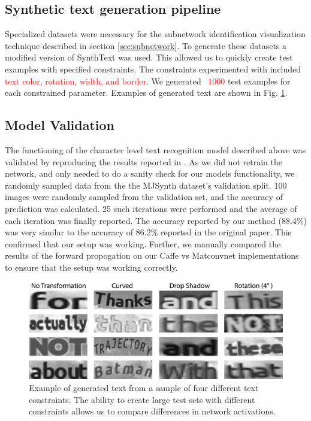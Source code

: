 \documentclass[10pt,twocolumn,letterpaper]{article}
\begin{document}
\subsection{Synthetic text generation pipeline} \label{sec:synthtext}
Specialized datasets were necessary for the subnetwork identification visualization technique described in section \ref{sec:subnetwork}.
To generate these datasets a modified version of SynthText \cite{Gupta16} was used. This allowed us to quickly create test examples with specified constraints. The constraints experimented with included \textcolor{red}{text color, rotation, width, and border}. We generated \textcolor{red}{~1000} test examples for each constrained parameter. Examples of generated text are shown in Fig. \ref{fig:genText}.

\subsection{Model Validation}
The functioning of the character level text recognition model described above was validated by reproducing the results reported in \cite{Jaderberg14c}. As we did not retrain the network, and only needed to do a sanity check for our models functionality, we randomly sampled data from the the MJSynth dataset's validation split. 100 images were randomly sampled from the validation set, and the accuracy of prediction was calculated. 25 such iterations were performed and the average of each iteration was finally reported. The accuracy reported by our method (88.4$\%$) was very similar to the accuracy of 86.2$\%$ reported in the original paper. This confirmed that our setup was working. Further, we manually compared the results of the forward propogation on our Caffe vs Matconvnet implementations to ensure that the setup was working correctly.

\begin{figure}
\includegraphics[width=\columnwidth]{Figures/synthtext_outputs/synthext_outputs.png}
\caption{Example of generated text from a sample of four different text constraints. The ability to create large test sets with different constraints allows us to compare differences in network activations.}
\label{fig:genText}
\end{figure}
\end{document}
